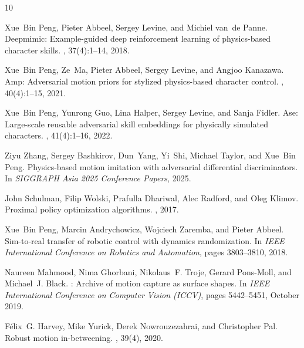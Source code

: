 \documentclass{article}
\begin{document}

\begin{thebibliography}{10}

Xue~Bin Peng, Pieter Abbeel, Sergey Levine, and Michiel van~de Panne.
\newblock Deepmimic: Example-guided deep reinforcement learning of
  physics-based character skills.
, 37(4):1--14, 2018.

Xue~Bin Peng, Ze~Ma, Pieter Abbeel, Sergey Levine, and Angjoo Kanazawa.
\newblock Amp: Adversarial motion priors for stylized physics-based character
  control.
, 40(4):1--15, 2021.

Xue~Bin Peng, Yunrong Guo, Lina Halper, Sergey Levine, and Sanja Fidler.
\newblock Ase: Large-scale reusable adversarial skill embeddings for physically
  simulated characters.
, 41(4):1--16, 2022.

Ziyu Zhang, Sergey Bashkirov, Dun~Yang, Yi~Shi, Michael Taylor, and Xue~Bin
  Peng.
\newblock Physics-based motion imitation with adversarial differential
  discriminators.
\newblock In {\em SIGGRAPH Asia 2025 Conference Papers}, 2025.

John Schulman, Filip Wolski, Prafulla Dhariwal, Alec Radford, and Oleg Klimov.
\newblock Proximal policy optimization algorithms.
, 2017.

Xue~Bin Peng, Marcin Andrychowicz, Wojciech Zaremba, and Pieter Abbeel.
\newblock Sim-to-real transfer of robotic control with dynamics randomization.
\newblock In {\em IEEE International Conference on Robotics and Automation},
  pages 3803--3810, 2018.

Naureen Mahmood, Nima Ghorbani, Nikolaus~F. Troje, Gerard Pons-Moll, and
  Michael~J. Black.
: Archive of motion capture as surface shapes.
\newblock In {\em IEEE International Conference on Computer Vision (ICCV)},
  pages 5442--5451, October 2019.

F{\'e}lix~G. Harvey, Mike Yurick, Derek Nowrouzezahrai, and Christopher Pal.
\newblock Robust motion in-betweening.
, 39(4), 2020.

\end{thebibliography}
\end{document}
